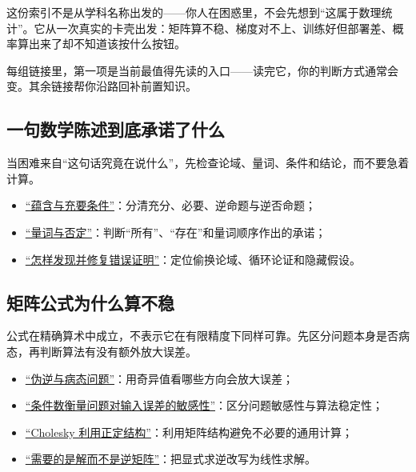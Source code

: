 这份索引不是从学科名称出发的——你人在困惑里，不会先想到``这属于数理统计''。它从一次真实的卡壳出发：矩阵算不稳、梯度对不上、训练好但部署差、概率算出来了却不知道该按什么按钮。

每组链接里，第一项是当前最值得先读的入口——读完它，你的判断方式通常会变。其余链接帮你沿路回补前置知识。

\subsection{一句数学陈述到底承诺了什么}

当困难来自``这句话究竟在说什么''，先检查论域、量词、条件和结论，而不要急着计算。

\begin{itemize}
\tightlist
\item \hyperref[sec:01-Mathematical-Language/01-Logic/02]{``蕴含与充要条件''}：分清充分、必要、逆命题与逆否命题；
\item \hyperref[sec:01-Mathematical-Language/01-Logic/03]{``量词与否定''}：判断``所有''、``存在''和量词顺序作出的承诺；
\item \hyperref[sec:01-Mathematical-Language/03-Proof-Techniques/04]{``怎样发现并修复错误证明''}：定位偷换论域、循环论证和隐藏假设。
\end{itemize}

\subsection{矩阵公式为什么算不稳}

公式在精确算术中成立，不表示它在有限精度下同样可靠。先区分问题本身是否病态，再判断算法有没有额外放大误差。

\begin{itemize}
\tightlist
\item \hyperref[sec:03-Linear-Algebra/07-SVD-and-Data-Applications/02]{``伪逆与病态问题''}：用奇异值看哪些方向会放大误差；
\item \hyperref[sec:08-Numerical-Analysis/01-Floating-Point-and-Error/03]{``条件数衡量问题对输入误差的敏感性''}：区分问题敏感性与算法稳定性；
\item \hyperref[sec:08-Numerical-Analysis/05-Numerical-Linear-Algebra/03]{``Cholesky 利用正定结构''}：利用矩阵结构避免不必要的通用计算；
\item \hyperref[sec:08-Numerical-Analysis/07-Numerical-Methods-for-ML/03]{``需要的是解而不是逆矩阵''}：把显式求逆改写为线性求解。
\end{itemize}

